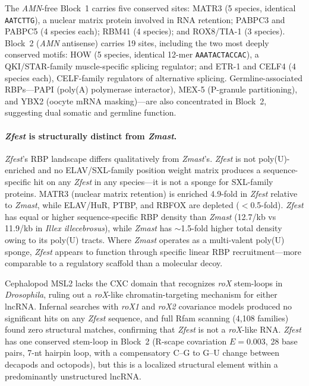 \documentclass[12pt]{article}
\newcommand{\illex}{\textit{Illex illecebrosus}\xspace}
\begin{document}
The \textit{AMN}-free Block~1 carries five conserved sites:
MATR3 (5 species, identical \texttt{AATCTTG}),
a nuclear matrix protein involved in RNA retention;
PABPC3 and PABPC5 (4 species each);
RBM41 (4 species); and ROX8/TIA-1 (3 species).
Block~2 (\textit{AMN} antisense) carries 19 sites,
including the two most deeply conserved motifs:
HOW (5 species, identical 12-mer \texttt{AAATACTACCAC}),
a QKI/STAR-family muscle-specific splicing regulator;
and ETR-1 and CELF4 (4 species each),
CELF-family regulators of alternative splicing.
Germline-associated RBPs---PAPI (poly(A) polymerase interactor),
MEX-5 (P-granule partitioning),
and YBX2 (oocyte mRNA masking)---are
also concentrated in Block~2,
suggesting dual somatic and germline function.

\paragraph{\textit{Zfest} is structurally distinct from \textit{Zmast}.}
\textit{Zfest}'s RBP landscape differs qualitatively from \textit{Zmast}'s.
\textit{Zfest} is not poly(U)-enriched
and no ELAV/SXL-family position weight matrix produces
a sequence-specific hit on any \textit{Zfest} in any species---it
is not a sponge for SXL-family proteins.
MATR3 (nuclear matrix retention) is enriched 4.9-fold in \textit{Zfest}
relative to \textit{Zmast},
while ELAV/HuR, PTBP, and RBFOX are depleted ($<$0.5-fold).
\textit{Zfest} has equal or higher sequence-specific
RBP density than \textit{Zmast} (12.7/kb vs 11.9/kb in \illex),
while \textit{Zmast} has $\sim$1.5-fold higher total density
owing to its poly(U) tracts.
Where \textit{Zmast} operates as a multi-valent poly(U) sponge,
\textit{Zfest} appears to function through specific linear RBP recruitment---more
comparable to a regulatory scaffold than a molecular decoy.

Cephalopod MSL2 lacks the CXC domain
that recognizes \textit{roX} stem-loops in \textit{Drosophila},
ruling out a \textit{roX}-like chromatin-targeting mechanism for either lncRNA.
Infernal searches with \textit{roX1} and \textit{roX2} covariance models
produced no significant hits on any \textit{Zfest} sequence,
and full Rfam scanning (4,108 families) found zero structural matches,
confirming that \textit{Zfest} is not a \textit{roX}-like RNA.
\textit{Zfest} has one conserved stem-loop in Block~2
(R-scape covariation $E = 0.003$, 28 base pairs, 7-nt hairpin loop,
with a compensatory C--G to G--U change between decapods and octopods),
but this is a localized structural element
within a predominantly unstructured lncRNA.
\end{document}
